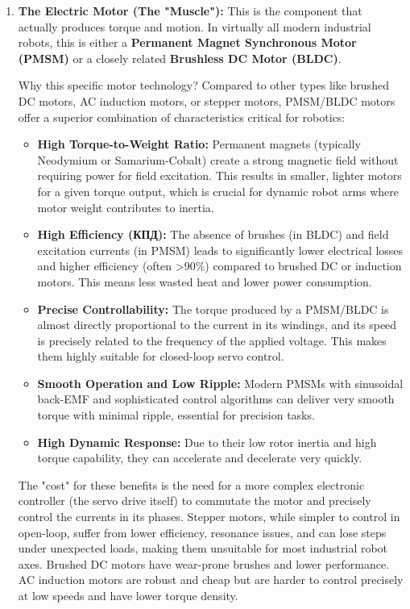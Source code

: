 \begin{enumerate}
    \item \textbf{The Electric Motor (The "Muscle"):} This is the component that actually produces torque and motion. In virtually all modern industrial robots, this is either a \textbf{Permanent Magnet Synchronous Motor (PMSM)} or a closely related \textbf{Brushless DC Motor (BLDC)}.
    
    Why this specific motor technology? Compared to other types like brushed DC motors, AC induction motors, or stepper motors, PMSM/BLDC motors offer a superior combination of characteristics critical for robotics:
    \begin{itemize}
        \item \textbf{High Torque-to-Weight Ratio:} Permanent magnets (typically Neodymium or Samarium-Cobalt) create a strong magnetic field without requiring power for field excitation. This results in smaller, lighter motors for a given torque output, which is crucial for dynamic robot arms where motor weight contributes to inertia.
        \item \textbf{High Efficiency (КПД):} The absence of brushes (in BLDC) and field excitation currents (in PMSM) leads to significantly lower electrical losses and higher efficiency (often >90\%) compared to brushed DC or induction motors. This means less wasted heat and lower power consumption.
        \item \textbf{Precise Controllability:} The torque produced by a PMSM/BLDC is almost directly proportional to the current in its windings, and its speed is precisely related to the frequency of the applied voltage. This makes them highly suitable for closed-loop servo control.
        \item \textbf{Smooth Operation and Low Ripple:} Modern PMSMs with sinusoidal back-EMF and sophisticated control algorithms can deliver very smooth torque with minimal ripple, essential for precision tasks.
        \item \textbf{High Dynamic Response:} Due to their low rotor inertia and high torque capability, they can accelerate and decelerate very quickly.
    \end{itemize}
    The "cost" for these benefits is the need for a more complex electronic controller (the servo drive itself) to commutate the motor and precisely control the currents in its phases. Stepper motors, while simpler to control in open-loop, suffer from lower efficiency, resonance issues, and can lose steps under unexpected loads, making them unsuitable for most industrial robot axes. Brushed DC motors have wear-prone brushes and lower performance. AC induction motors are robust and cheap but are harder to control precisely at low speeds and have lower torque density.


\end{enumerate}
